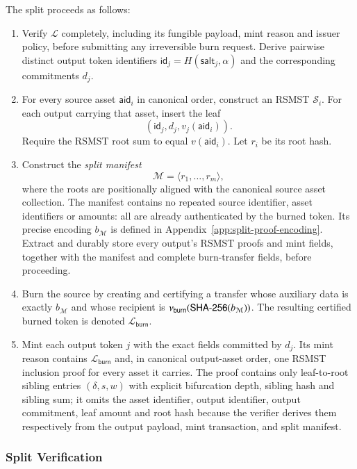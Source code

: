 The split proceeds as follows:
\begin{enumerate}
	\item Verify $\mathcal{L}$ completely, including its fungible payload, mint reason and issuer policy, before submitting any irreversible burn request.  Derive pairwise distinct output token identifiers $\mathsf{id}_j=H(\mathsf{salt}_j,\alpha)$ and the corresponding commitments $d_j$.
	\item For every source asset $\mathsf{aid}_i$ in canonical order, construct an RSMST $\mathcal{S}_i$.  For each output carrying that asset, insert the leaf
	\[
	(\mathsf{id}_j,d_j,v_j(\mathsf{aid}_i)).
	\]
	Require the RSMST root sum to equal $v(\mathsf{aid}_i)$.  Let $r_i$ be its root hash.
	\item Construct the \emph{split manifest}
	\[
	\mathcal{M}=\langle r_1,\ldots,r_m\rangle,
	\]
	where the roots are positionally aligned with the canonical source asset collection.  The manifest contains no repeated source identifier, asset identifiers or amounts: all are already authenticated by the burned token.  Its precise encoding $b_\mathcal{M}$ is defined in Appendix~\ref{app:split-proof-encoding}.  Extract and durably store every output's RSMST proofs and mint fields, together with the manifest and complete burn-transfer fields, before proceeding.
	\item Burn the source by creating and certifying a transfer whose auxiliary data is exactly $b_\mathcal{M}$ and whose recipient is $\nu_\mathsf{burn}(\mathsf{SHA\text{-}256}(b_\mathcal{M}))$.  The resulting certified burned token is denoted $\mathcal{L}_\mathsf{burn}$.
	\item Mint each output token $j$ with the exact fields committed by $d_j$.  Its mint reason contains $\mathcal{L}_\mathsf{burn}$ and, in canonical output-asset order, one RSMST inclusion proof for every asset it carries.  The proof contains only leaf-to-root sibling entries $(\delta,s,w)$ with explicit bifurcation depth, sibling hash and sibling sum; it omits the asset identifier, output identifier, output commitment, leaf amount and root hash because the verifier derives them respectively from the output payload, mint transaction, and split manifest.
\end{enumerate}


\subsubsection{Split Verification}\label{sec:split-verification}

